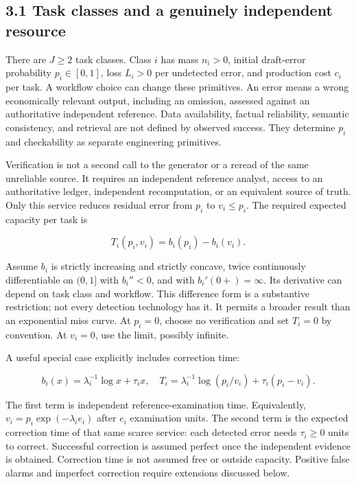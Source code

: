 \documentclass[
  11pt,
  a4paper,
]{article}
\begin{document}
\hypertarget{task-classes-and-a-genuinely-independent-resource}{%
\subsection{3.1 Task classes and a genuinely independent
resource}\label{task-classes-and-a-genuinely-independent-resource}}

There are \(J\geq2\) task classes. Class \(i\) has mass \(n_i>0\),
initial draft-error probability \(p_i\in[0,1]\), loss \(L_i>0\) per
undetected error, and production cost \(c_i\) per task. A workflow
choice can change these primitives. An error means a wrong economically
relevant output, including an omission, assessed against an
authoritative independent reference. Data availability, factual
reliability, semantic consistency, and retrieval are not defined by
observed success. They determine \(p_i\) and checkability as separate
engineering primitives.

Verification is not a second call to the generator or a reread of the
same unreliable source. It requires an independent reference analyst,
access to an authoritative ledger, independent recomputation, or an
equivalent source of truth. Only this service reduces residual error
from \(p_i\) to \(v_i\leq p_i\). The required expected capacity per task
is

\[T_i(p_i,v_i)=b_i(p_i)-b_i(v_i). \tag{1}\]

Assume \(b_i\) is strictly increasing and strictly concave, twice
continuously differentiable on \((0,1]\) with \(b_i''<0\), and with
\(b_i'(0+)=\infty\). Its derivative can depend on task class and
workflow. This difference form is a substantive restriction; not every
detection technology has it. It permits a broader result than an
exponential miss curve. At \(p_i=0\), choose no verification and set
\(T_i=0\) by convention. At \(v_i=0\), use the limit, possibly infinite.

A useful special case explicitly includes correction time:

\[b_i(x)=\lambda_i^{-1}\log x+\tau_i x,\quad
T_i=\lambda_i^{-1}\log(p_i/v_i)+\tau_i(p_i-v_i). \tag{2}\]

The first term is independent reference-examination time. Equivalently,
\(v_i=p_i\exp(-\lambda_i e_i)\) after \(e_i\) examination units. The
second term is the expected correction time of that same scarce service:
each detected error needs \(\tau_i\geq0\) units to correct. Successful
correction is assumed perfect once the independent evidence is obtained.
Correction time is not assumed free or outside capacity. Positive false
alarms and imperfect correction require extensions discussed below.
\end{document}
